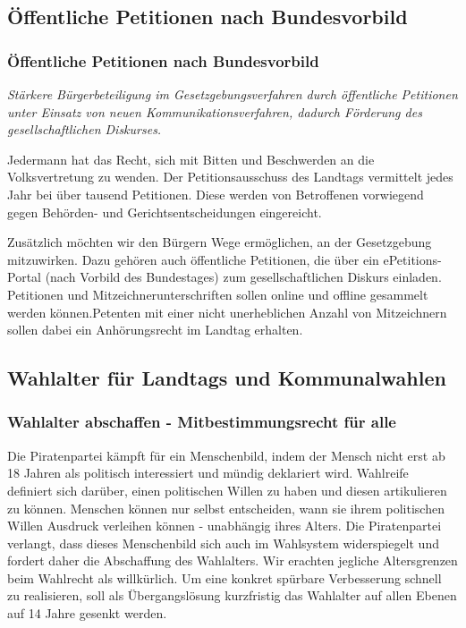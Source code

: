 \subsection*{Öffentliche Petitionen nach Bundesvorbild}

\subsubsection{Öffentliche Petitionen nach Bundesvorbild}
\abstimmung
\textit{Stärkere Bürgerbeteiligung im Gesetzgebungsverfahren durch öffentliche Petitionen unter Einsatz von neuen Kommunikationsverfahren, dadurch Förderung des gesellschaftlichen Diskurses.}

Jedermann hat das Recht, sich mit Bitten und Beschwerden an die Volksvertretung zu wenden. Der Petitionsausschuss des Landtags vermittelt jedes Jahr bei über tausend Petitionen. Diese werden von Betroffenen vorwiegend gegen Behörden- und Gerichtsentscheidungen eingereicht.

Zusätzlich möchten wir den Bürgern Wege ermöglichen, an der Gesetzgebung mitzuwirken. Dazu gehören auch öffentliche Petitionen, die über ein ePetitions-Portal (nach Vorbild des Bundestages) zum gesellschaftlichen Diskurs einladen. Petitionen und Mitzeichnerunterschriften sollen online und offline gesammelt werden können.Petenten mit einer nicht unerheblichen Anzahl von Mitzeichnern sollen dabei ein Anhörungsrecht im Landtag erhalten.
 
\subsection*{Wahlalter für Landtags und Kommunalwahlen}
\label{wp:demokratie:wahlalter1}

\subsubsection{Wahlalter abschaffen - Mitbestimmungsrecht für alle}
\abstimmung
Die Piratenpartei kämpft für ein Menschenbild, indem der Mensch nicht erst ab 18 Jahren als politisch interessiert und mündig deklariert wird. Wahlreife definiert sich darüber, einen politischen Willen zu haben und diesen artikulieren zu können. Menschen können nur selbst entscheiden, wann sie ihrem politischen Willen Ausdruck verleihen können - unabhängig ihres Alters. Die Piratenpartei verlangt, dass dieses Menschenbild sich auch im Wahlsystem widerspiegelt und fordert daher die Abschaffung des Wahlalters. Wir erachten jegliche Altersgrenzen beim Wahlrecht als willkürlich. Um eine konkret spürbare Verbesserung schnell zu realisieren, soll als Übergangslösung kurzfristig das Wahlalter auf allen Ebenen auf 14 Jahre gesenkt werden.

